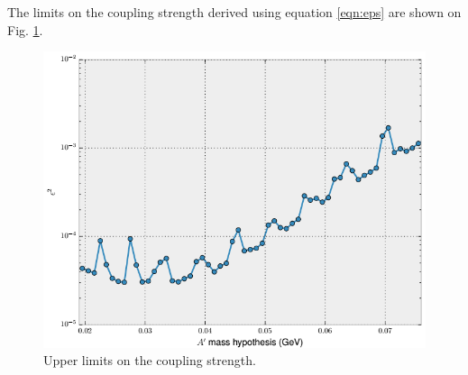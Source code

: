 The limits on the coupling strength derived using equation \ref{eqn:eps}
are shown on Fig. \ref{fig:epsilon_upper_limit}.
\begin{figure}[b]
    \centering
    \includegraphics[width=.9\textwidth]{images/final_coupling_upper_limits.png}
    \caption{Upper limits on the coupling strength.}
    \label{fig:epsilon_upper_limit}
\end{figure}





